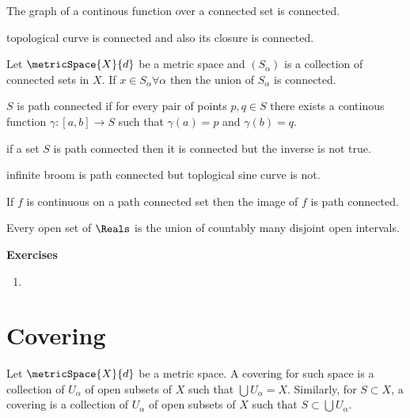 \begin{theorem}
    The graph of a continous function over a connected set is connected.
\end{theorem}
\begin{example}
    topological curve is connected and also its closure is connected.
\end{example}
\begin{proposition}
    Let \(\metricSpace{X}{d}\) be a metric space and \((S_\alpha)\) is a collection of connected sets in \(X\). If \(x \in S_\alpha \forall \alpha\) then the union of \(S_\alpha\) is connected.
\end{proposition}
\begin{definition}
    \(S\) is path connected if for every pair of points \(p,q \in S\) there exists a continous function \(\gamma: [a,b] \to S\) such that \(\gamma(a) = p\) and \(\gamma(b) = q\).
\end{definition}
\begin{theorem}
    if a set \(S\) is path connected then it is connected but the inverse is not true.
\end{theorem}
\begin{example}
    infinite broom is path connected but toplogical sine curve is not.
\end{example}
\begin{proposition}
    If \(f\) is continuous on a path connected set then the image of \(f\) is path connected.
\end{proposition}
\begin{proposition}
    Every open set of \(\Reals\) is the union of countably many disjoint open intervals.
\end{proposition}
{\Large\textbf{Exercises}}
\begin{enumerate}
    \item
\end{enumerate}
\newpage
\section{Covering}
\begin{definition}[Covering]
    Let \(\metricSpace{X}{d}\) be a metric space. A covering for such space is a collection of \(U_\alpha\) of open subsets of \(X\) such that \(\bigcup U_\alpha = X\). Similarly, for \(S \subset X\), a covering is a collection of \(U_\alpha\) of open subsets of \(X\) such that \(S \subset \bigcup U_\alpha\).
\end{definition}

